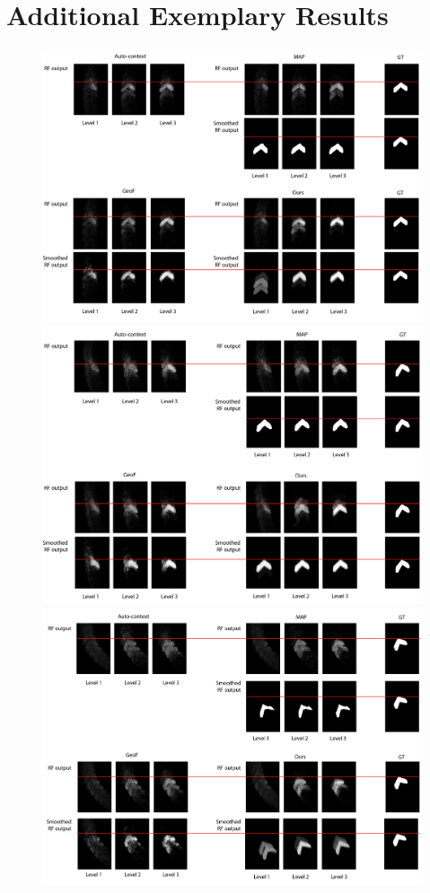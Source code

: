 \documentclass[10pt,twocolumn,letterpaper]{article}
\begin{document}
\section{Additional Exemplary Results}
%
\begin{figure}[t]
\begin{center}
\includegraphics[width=\columnwidth]{supp_rescue.jpg} 
\includegraphics[width=\columnwidth]{supp-both_right.jpg} 
\includegraphics[width=\columnwidth]{supp_both_wrong.jpg} 

\end{center}
\end{figure}
\end{document}
